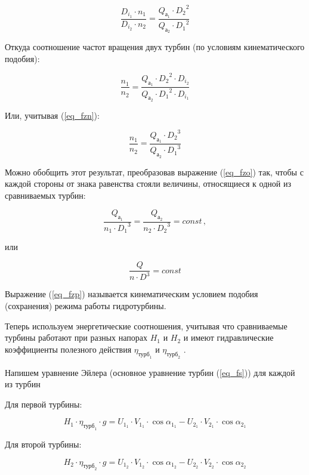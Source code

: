 $$
   \frac{D_{i_1} \cdot n_1}{D_{i_2} \cdot n_2} = \frac{Q_{\text{а}_1} \cdot {D_2}^2  }{Q_{\text{а}_2} \cdot {D_1}^2 }
$$

Откуда соотношение частот вращения двух турбин (по условиям кинематического подобия):

$$
   \frac{n_1}{n_2} = \frac{Q_{\text{а}_1} \cdot {D_2}^2 \cdot D_{i_2} }{Q_{\text{а}_2} \cdot {D_1}^2 \cdot D_{i_1} }
$$

Или, учитывая (\ref{eq_fzn}):

\begin{equation}
\label{eq_fzo}
   \frac{n_1}{n_2} = \frac{Q_{\text{а}_1} \cdot {D_2}^3  }{Q_{\text{а}_2} \cdot {D_1}^3 }
\end{equation}

Можно обобщить этот результат, преобразовав выражение (\ref{eq_fzo}) так, чтобы с каждой стороны от знака равенства стояли величины, относящиеся к одной из сравниваемых турбин:

$$
   \frac{Q_{\text{а}_1}}{n_1 \cdot {D_1}^3} = \frac{Q_{\text{а}_2}}{n_2 \cdot {D_2}^3} = const \, ,
$$

или

\begin{equation}
\label{eq_fzp}
   \frac{Q}{n \cdot D^3} = const
\end{equation}

Выражение (\ref{eq_fzp}) называется кинематическим условием подобия (сохранения) режима работы гидротурбины.

\vspace{1 cm}

Теперь используем энергетические соотношения, учитывая что сравниваемые турбины работают при разных напорах $H_1$ и $H_2$ и имеют гидравлические коэффициенты полезного действия $\eta_{\text{турб}_1}$ и $\eta_{\text{турб}_2}$ .

Напишем уравнение Эйлера (основное уравнение турбин (\ref{eq_fs})) для каждой из турбин

Для первой турбины:

\begin{equation}
\label{eq_fzq}
  H_1 \cdot \eta_{\text{турб}_1} \cdot g = U_{1_1} \cdot V_{1_1} \cdot \cos{\alpha_{1_1}} - U_{2_1} \cdot V_{2_1} \cdot \cos{\alpha_{2_1}}
\end{equation}

Для второй турбины:

\begin{equation}
\label{eq_fzr}
  H_2 \cdot \eta_{\text{турб}_2} \cdot g = U_{1_2} \cdot V_{1_2} \cdot \cos{\alpha_{1_2}} - U_{2_2} \cdot V_{2_2} \cdot \cos{\alpha_{2_2}}
\end{equation}

